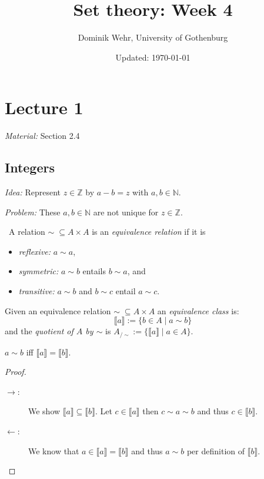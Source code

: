 \documentclass{whrartcl}
\title{Set theory: Week 4}
\author{Dominik Wehr, University of Gothenburg}
\date{Updated: \today}
\newcommand{\NN}{\mathbb{N}}
\newcommand{\ZZ}{\mathbb{Z}}
\newcommand{\cls}[1]{\llbracket #1 \rrbracket}
\begin{document}
\maketitle

\section{Lecture 1}

\emph{Material:} Section 2.4

\subsection{Integers}

\emph{Idea:} Represent $z \in \ZZ$ by $a - b = z$ with $a, b \in \NN$.

\emph{Problem:} These $a, b \in \NN$ are not unique for $z \in \ZZ$.

\begin{definition}
  \
  A relation $\sim \;\subseteq A \times A$ is an \emph{equivalence relation} if it is
  \begin{itemize}
  \item \emph{reflexive:} $a \sim a$,
  \item \emph{symmetric:} $a \sim b$ entails $b \sim a$, and
  \item \emph{transitive:} $a \sim b$ and $b \sim c$ entail $a \sim c$.
  \end{itemize}
  Given an equivalence relation $\sim \; \subseteq A \times A$ an \emph{equivalence
  class} is:
  \[
    \llbracket a \rrbracket := \{b \in A \mid a \sim b\}
  \]
  and the \emph{quotient of $A$ by $\sim$} is $A_{/ \sim} := \{\llbracket a
  \rrbracket \mid a \in A\}$.
\end{definition}

\begin{lemma}
  $a \sim b$ iff $\cls{a} = \cls{b}$.
\end{lemma}
\begin{proof}
  \
  \begin{description}
  \item[$\to$:] We show $\cls{a} \subseteq \cls{b}$. Let $c \in \cls{a}$ then $c
    \sim a \sim b$ and thus $c \in \cls{b}$.
  \item[$\leftarrow$:] We know that $a \in \cls{a} = \cls{b}$ and thus $a \sim
    b$ per definition of $\cls{b}$.
  \end{description}
\end{proof}
\end{document}
